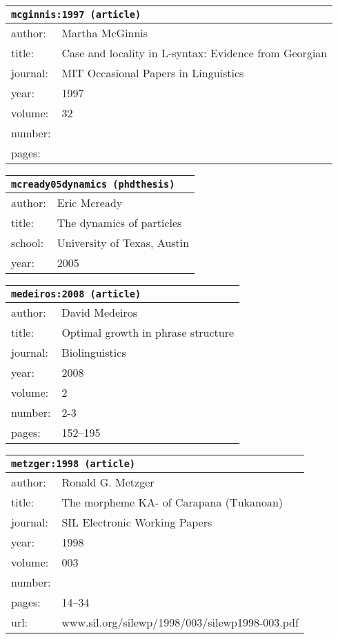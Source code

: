 \documentclass{article}
\begin{document}
\bigskip

\begin{tabular}{p{}p{}}
\multicolumn{2}{l}{\texttt{mcginnis:1997 (article)}}\\
\hline
author: & Martha McGinnis\\
title: & Case and locality in L-syntax: Evidence from Georgian\\
journal: & MIT Occasional Papers in Linguistics\\
year: & 1997\\
volume: & 32\\
number: & \\
pages: & \\
\end{tabular}

\bigskip

\begin{tabular}{p{}p{}}
\multicolumn{2}{l}{\texttt{mcready05dynamics (phdthesis)}}\\
\hline
author: & Eric Mcready\\
title: & The dynamics of particles\\
school: & University of Texas, Austin\\
year: & 2005\\
\end{tabular}

\bigskip

\begin{tabular}{p{}p{}}
\multicolumn{2}{l}{\texttt{medeiros:2008 (article)}}\\
\hline
author: & David Medeiros\\
title: & Optimal growth in phrase structure\\
journal: & Biolinguistics\\
year: & 2008\\
volume: & 2\\
number: & 2-3\\
pages: & 152--195\\
\end{tabular}

\bigskip

\begin{tabular}{p{}p{}}
\multicolumn{2}{l}{\texttt{metzger:1998 (article)}}\\
\hline
author: & Ronald G. Metzger\\
title: & The morpheme \textsc{KA}- of \textsc{C}arapana (\textsc{T}ukanoan)\\
journal: & SIL Electronic Working Papers\\
year: & 1998\\
volume: & 003\\
number: & \\
pages: & 14--34\\
url: & www.sil.org/silewp/1998/003/silewp1998-003.pdf\\
\end{tabular}
\end{document}
